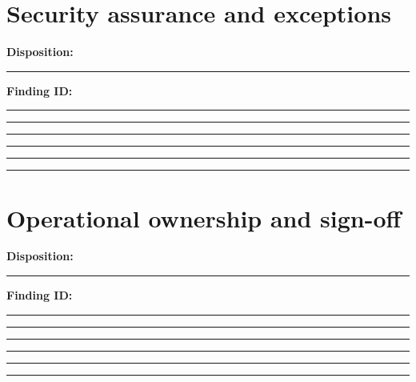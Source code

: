 \documentclass[11pt,letterpaper]{article}
\begin{document}
\section{Security assurance and exceptions}
\noindent\textbf{Disposition:}\rule{2.5cm}{0.4pt}\quad\textbf{Finding ID:}\rule{4cm}{0.4pt}

\vspace{2mm}
\noindent\rule{0.93\linewidth}{0.4pt}\par\vspace{13pt}
\noindent\rule{0.93\linewidth}{0.4pt}\par\vspace{13pt}
\noindent\rule{0.93\linewidth}{0.4pt}\par\vspace{13pt}
\noindent\rule{0.93\linewidth}{0.4pt}\par\vspace{13pt}
\noindent\rule{0.93\linewidth}{0.4pt}\par\vspace{13pt}
\section{Operational ownership and sign-off}
\noindent\textbf{Disposition:}\rule{2.5cm}{0.4pt}\quad\textbf{Finding ID:}\rule{4cm}{0.4pt}

\vspace{2mm}
\noindent\rule{0.93\linewidth}{0.4pt}\par\vspace{13pt}
\noindent\rule{0.93\linewidth}{0.4pt}\par\vspace{13pt}
\noindent\rule{0.93\linewidth}{0.4pt}\par\vspace{13pt}
\noindent\rule{0.93\linewidth}{0.4pt}\par\vspace{13pt}
\noindent\rule{0.93\linewidth}{0.4pt}\par\vspace{13pt}
\end{document}
